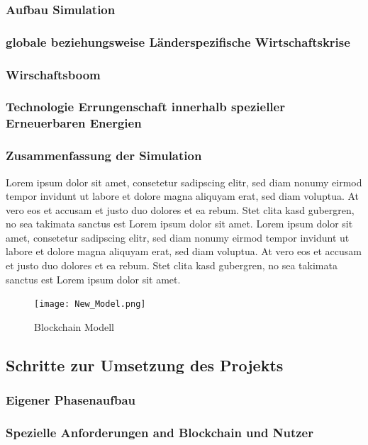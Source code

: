 \documentclass[a4paper, 10pt]{scrartcl}
\begin{document}
\subsubsection{Aufbau Simulation}
\subsubsection{globale beziehungsweise Länderspezifische Wirtschaftskrise}
\subsubsection{Wirschaftsboom}
\subsubsection{Technologie Errungenschaft innerhalb spezieller Erneuerbaren Energien}
\subsubsection{Zusammenfassung der Simulation}

Lorem ipsum dolor sit amet, consetetur sadipscing elitr, sed diam nonumy eirmod tempor invidunt ut labore et dolore magna aliquyam erat, sed diam voluptua. At vero eos et accusam et justo duo dolores et ea rebum. Stet clita kasd gubergren, no sea takimata sanctus est Lorem ipsum dolor sit amet. Lorem ipsum dolor sit amet, consetetur sadipscing elitr, sed diam nonumy eirmod tempor invidunt ut labore et dolore magna aliquyam erat, sed diam voluptua. At vero eos et accusam et justo duo dolores et ea rebum. Stet clita kasd gubergren, no sea takimata sanctus est Lorem ipsum dolor sit amet.
\begin{figure}[ht]
\begin{center}
\texttt{[image: New\_Model.png]}
\caption{Blockchain Modell}
\label{Blockchain_Modell}
\end{center}
\end{figure}

\subsection{Schritte zur Umsetzung des Projekts}
\subsubsection{Eigener Phasenaufbau}
\subsubsection{Spezielle Anforderungen and Blockchain und Nutzer}
\end{document}
